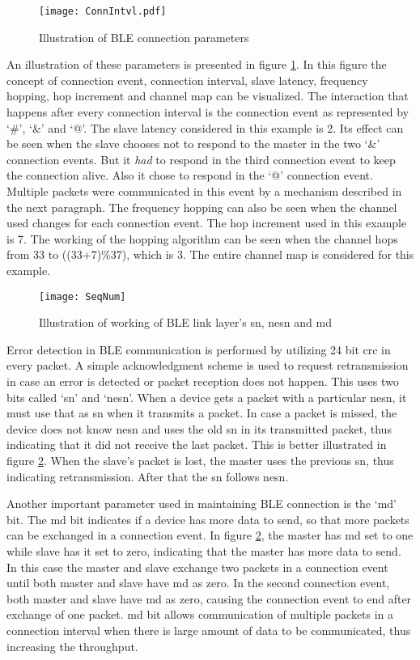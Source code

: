\begin{figure}[h]
\centering
\texttt{[image: ConnIntvl.pdf]}
\caption{Illustration of BLE connection parameters}
\label{fig:ConnIntvl}
\end{figure}

An illustration of these parameters is presented in figure \ref{fig:ConnIntvl}. In this figure the concept of connection event, connection interval, slave latency, frequency hopping, hop increment and channel map can be visualized. The interaction that happens after every connection interval is the connection event as represented by `\#', `\&' and `@'. The slave latency considered in this example is 2. Its effect can be seen when the slave chooses not to respond to the master in the two `\&' connection events. But it \emph{had} to respond in the third connection event to keep the connection alive. Also it chose to respond in the `@' connection event. Multiple packets were communicated in this event by a mechanism described in the next paragraph. The frequency hopping can also be seen when the channel used changes for each connection event. The hop increment used in this example is 7. The working of the hopping algorithm can be seen when the channel hops from 33 to ((33+7)\%37), which is 3. The entire channel map is considered for this example. 


\begin{figure}[h]
\texttt{[image: SeqNum]}
\caption{Illustration of working of BLE link layer's \gls{sn}, \gls{nesn} and \acrshort{md}}
\label{fig:SeqNum}
\end{figure}

Error detection in BLE communication is performed by utilizing 24 bit \gls{crc} in every packet. A simple acknowledgment scheme is used to request retransmission in case an error is detected or packet reception does not happen. This uses two bits called `\gls{sn}' and `\gls{nesn}'. When a device gets a packet with a particular \gls{nesn},  it must use that as \gls{sn} when it transmits a packet. In case a packet is missed, the device does not know \gls{nesn} and uses the old \gls{sn} in its transmitted packet, thus indicating that it did not receive the last packet. This is better illustrated in figure \ref{fig:SeqNum}. When the slave's packet is lost, the master uses the previous \gls{sn}, thus indicating retransmission. After that the \gls{sn} follows \gls{nesn}.

 
Another important parameter used in maintaining BLE connection is the `\gls{md}' bit. The \gls{md} bit indicates if a device has more data to send, so that more packets can be exchanged in a connection event. In figure \ref{fig:SeqNum}, the master has \gls{md} set to one while slave has it set to zero, indicating that the master has more data to send. In this case the master and slave exchange two packets in a connection event until both master and slave have \gls{md} as zero. In the second connection event, both master and slave have \gls{md} as zero, causing the connection event to end after exchange of one packet. \gls{md} bit allows communication of multiple packets in a connection interval when there is large amount of data to be communicated, thus increasing the throughput.

